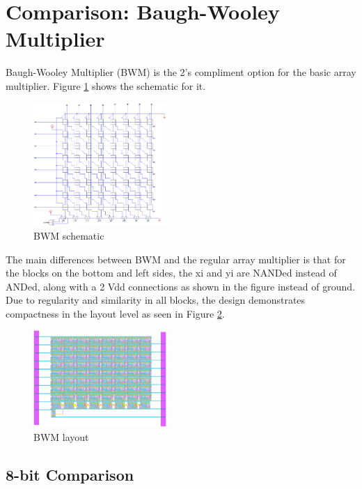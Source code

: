 \documentclass[journal]{IEEEtran}
\begin{document}
\section{Comparison: Baugh-Wooley Multiplier}

Baugh-Wooley Multiplier (BWM) is the 2’s compliment option for the basic array multiplier. Figure \ref{fig:12} shows the schematic for it.

\vspace{-10pt}

\begin{figure}[h!]
  \centering
  \includegraphics[width=0.45\textwidth]{12.png}
  \centering
  \caption{BWM schematic}
  \label{fig:12}
\end{figure}


The main differences between BWM and the regular array multiplier is that for the blocks on the bottom and left sides, the xi and yi are NANDed instead of ANDed, along with a 2 Vdd connections as shown in the figure instead of ground. Due to regularity and similarity in all blocks, the design demonstrates compactness in the layout level as seen in Figure \ref{fig:13}.

\begin{figure}[h!]
  \centering
  \includegraphics[width=0.45\textwidth]{13.png}
  \centering
  \caption{BWM layout}
  \label{fig:13}
\end{figure}

\vspace{-10pt}

\subsection{8-bit Comparison}
\end{document}
